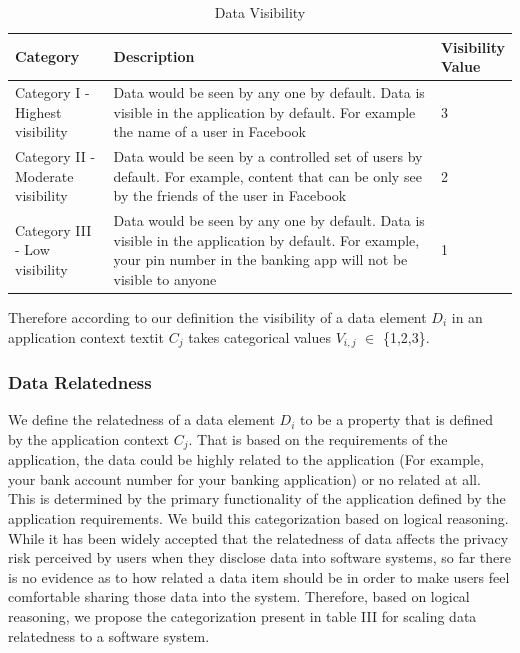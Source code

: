 \documentclass[conference]{IEEEtran}
\begin{document}
\begin{center}
\begin{table}[htbp]
\caption{Data Visibility}
\begin{center}
\begin{adjustbox}{width=0.5\textwidth} 
\begin{tabular}{|p{0.2\linewidth}|p{0.7\linewidth}|p{0.1\linewidth}|} 
\hline
Category & Description & Visibility Value \\
\hline
Category I - Highest visibility & Data would be seen by any one by default. Data is visible in the application by default. For example the name of a user in Facebook & 3 \\
\hline
Category II - Moderate visibility & Data would be seen by a controlled set of users by default. For example, content that can be only see by the friends of the user in Facebook & 2 \\
\hline
Category III - Low visibility & Data would be seen by any one by default. Data is visible in the application by default. For example, your pin number in the banking app will not be visible to anyone & 1 \\
\hline
\end{tabular}
\end{adjustbox}
\end{center}
\end{table}
\end{center} 

Therefore according to our definition the visibility of a data element \textit {$D_i$} in an application context textit {$C_j$} takes categorical values \textit {$V_{i,j}$} $\in$ \{1,2,3\}.

\subsubsection {Data Relatedness} We define the relatedness of a data element \textit {$D_i$} to be a property that is defined by the application context \textit {$C_j$}. That is based on the requirements of the application, the data could be highly related to the application (For example, your bank account number for your banking application) or no related at all. This is determined by the primary functionality of the application defined by the application requirements. We build this categorization based on logical reasoning. While it has been widely accepted that the relatedness of data affects the privacy risk perceived by users when they disclose data into software systems, so far there is no evidence as to how related a data item should be in order to make users feel comfortable sharing those data into the system. Therefore, based on logical reasoning, we propose the categorization present in table III for scaling data relatedness to a software system. 
\end{document}
